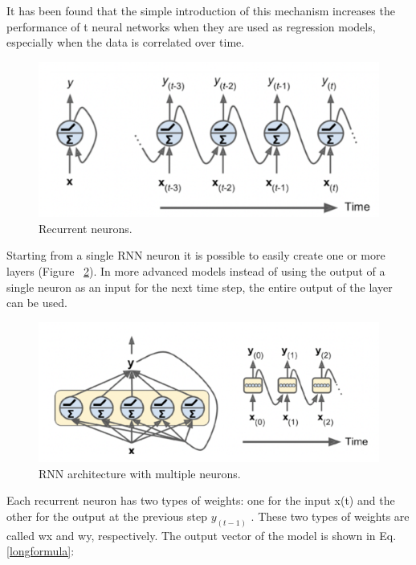 It has been found that the simple introduction of this mechanism increases the performance of t neural networks when they are used as regression models, especially when the data is correlated over time. 

\begin{figure} [h!]
    \centering
    \includegraphics[width=\textwidth,height=\textheight,keepaspectratio]{Assets/Theory_and_methods/unnamed-6.png}
    \caption{Recurrent neurons.}
    \label{fig:Recurrent_neurons}
\end{figure}

Starting from a single RNN neuron it is possible to easily create one or more layers (Figure ~\ref{fig:RNN_multi_layer}). In more advanced models instead of using the output of a single neuron as an input for the next time step, the entire output of the layer can be used.

\begin{figure} [h!]
    \centering
    \includegraphics[width=\textwidth,height=\textheight,keepaspectratio]{Assets/Theory_and_methods/unnamed-7.png}
    \caption{RNN architecture with multiple neurons.}
    \label{fig:RNN_multi_layer}
\end{figure}

Each recurrent neuron has two types of weights: one for the input x(t) and the other for the output at the previous step $y_{(t-1)}$ . These two types of weights are called wx and wy, respectively. The output vector of the model is shown in Eq. \eqref{longformula}:

